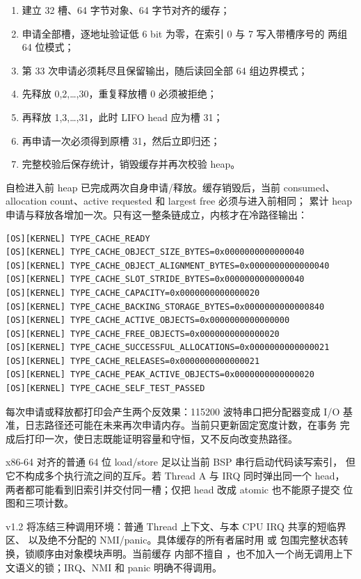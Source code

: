 \begin{enumerate}[label=\arabic*.]
  \item 建立 32 槽、64 字节对象、64 字节对齐的缓存；
  \item 申请全部槽，逐地址验证低 6 bit 为零，在索引 0 与 7 写入带槽序号的
        两组 64 位模式；
  \item 第 33 次申请必须耗尽且保留输出，随后读回全部 64 组边界模式；
  \item 先释放 0,2,\ldots,30，重复释放槽 0 必须被拒绝；
  \item 再释放 1,3,\ldots,31，此时 LIFO head 应为槽 31；
  \item 再申请一次必须得到原槽 31，然后立即归还；
  \item 完整校验后保存统计，销毁缓存并再次校验 heap。
\end{enumerate}

自检进入前 heap 已完成两次自身申请/释放。缓存销毁后，当前 consumed、
allocation count、active requested 和 largest free 必须与进入前相同；
累计 heap 申请与释放各增加一次。只有这一整条链成立，内核才在冷路径输出：

\begin{verbatim}
[OS][KERNEL] TYPE_CACHE_READY
[OS][KERNEL] TYPE_CACHE_OBJECT_SIZE_BYTES=0x0000000000000040
[OS][KERNEL] TYPE_CACHE_OBJECT_ALIGNMENT_BYTES=0x0000000000000040
[OS][KERNEL] TYPE_CACHE_SLOT_STRIDE_BYTES=0x0000000000000040
[OS][KERNEL] TYPE_CACHE_CAPACITY=0x0000000000000020
[OS][KERNEL] TYPE_CACHE_BACKING_STORAGE_BYTES=0x0000000000000840
[OS][KERNEL] TYPE_CACHE_ACTIVE_OBJECTS=0x0000000000000000
[OS][KERNEL] TYPE_CACHE_FREE_OBJECTS=0x0000000000000020
[OS][KERNEL] TYPE_CACHE_SUCCESSFUL_ALLOCATIONS=0x0000000000000021
[OS][KERNEL] TYPE_CACHE_RELEASES=0x0000000000000021
[OS][KERNEL] TYPE_CACHE_PEAK_ACTIVE_OBJECTS=0x0000000000000020
[OS][KERNEL] TYPE_CACHE_SELF_TEST_PASSED
\end{verbatim}

每次申请或释放都打印会产生两个反效果：115200 波特串口把分配器变成 I/O
基准，日志路径还可能在未来再次申请内存。当前只更新固定宽度计数，在事务
完成后打印一次，使日志既能证明容量和守恒，又不反向改变热路径。

x86-64 对齐的普通 64 位 load/store 足以让当前 BSP 串行启动代码读写索引，
但它不构成多个执行流之间的互斥。若 Thread A 与 IRQ 同时弹出同一个 head，
两者都可能看到旧索引并交付同一槽；仅把 head 改成 atomic 也不能原子提交
位图和三项计数。

v1.2 将冻结三种调用环境：普通 Thread 上下文、与本 CPU IRQ 共享的短临界区、
以及绝不分配的 NMI/panic。具体缓存的所有者届时用  或
 包围完整状态转换，锁顺序由对象模块声明。当前缓存
内部不擅自 ，也不加入一个尚无调用上下文语义的锁；IRQ、NMI 和
panic 明确不得调用。

